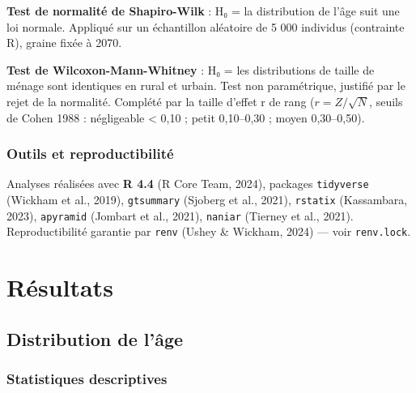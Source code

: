 \documentclass[
  10pt,
]{article}
\begin{document}
\textbf{Test de normalité de Shapiro-Wilk} : H₀ = la distribution de
l'âge suit une loi normale. Appliqué sur un échantillon aléatoire de 5
000 individus (contrainte R), graine fixée à 2070.

\textbf{Test de Wilcoxon-Mann-Whitney} : H₀ = les distributions de
taille de ménage sont identiques en rural et urbain. Test non
paramétrique, justifié par le rejet de la normalité. Complété par la
taille d'effet r de rang (\(r = Z / \sqrt{N}\), seuils de Cohen 1988 :
négligeable \textless{} 0,10 ; petit 0,10--0,30 ; moyen 0,30--0,50).

\subsubsection{Outils et
reproductibilité}\label{outils-et-reproductibilituxe9}

Analyses réalisées avec \textbf{R 4.4} (R Core Team, 2024), packages
\texttt{tidyverse} (Wickham et al., 2019), \texttt{gtsummary} (Sjoberg
et al., 2021), \texttt{rstatix} (Kassambara, 2023), \texttt{apyramid}
(Jombart et al., 2021), \texttt{naniar} (Tierney et al., 2021).
Reproductibilité garantie par \texttt{renv} (Ushey \& Wickham, 2024) ---
voir \texttt{renv.lock}.

\newpage{}

\section{Résultats}\label{ruxe9sultats}

\subsection{Distribution de l'âge}\label{distribution-de-luxe2ge}

\subsubsection{Statistiques
descriptives}\label{statistiques-descriptives}
\end{document}
